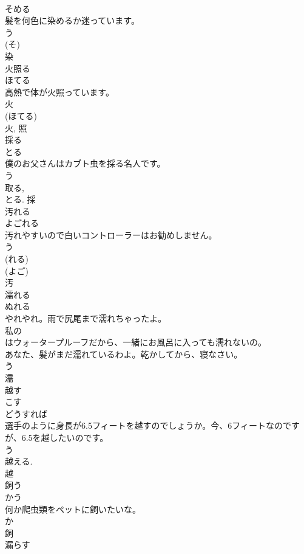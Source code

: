 \documentclass[8pt]{extreport}
\begin{document}
\begin{CJK}{UTF8}{min}
\\	そめる	
\\	髪を何色に染めるか迷っています。	
\\	う 
\\	(そ) 
\\	染	
\\	火照る	
\\	ほてる	
\\	高熱で体が火照っています。	
\\	火 
\\	(ほてる) 
\\	火, 照	
\\	採る	
\\	とる	
\\	僕のお父さんはカブト虫を採る名人です。	
\\	う 
\\	取る, 
\\	とる.	採	
\\	汚れる	
\\	よごれる	
\\	汚れやすいので白いコントローラーはお勧めしません。	
\\	う 
\\	(れる) 
\\	(よご) 
\\	汚	
\\	濡れる	
\\	ぬれる	
\\	やれやれ。雨で尻尾まで濡れちゃったよ。	
\\	私の
\\	はウォータープルーフだから、一緒にお風呂に入っても濡れないの。	
\\	あなた、髪がまだ濡れているわよ。乾かしてから、寝なさい。	
\\	う 
\\	濡	
\\	越す	
\\	こす	
\\	どうすれば
\\	選手のように身長が6.5フィートを越すのでしょうか。今、6フィートなのですが、6.5を越したいのです。	
\\	う 
\\	越える. 
\\	越	
\\	飼う	
\\	かう	
\\	何か爬虫類をペットに飼いたいな。	
\\	か 
\\	飼	
\\	漏らす	

\end{CJK}
\end{document}
